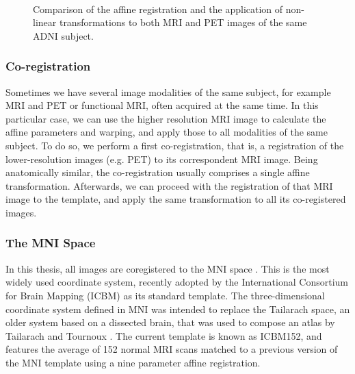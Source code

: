 \begin{figure}[bth]
	\myfloatalign
	 \\
	\caption[Comparison of the affine registration and the application of non-linear transformations to the images]{Comparison of the affine registration and the application of non-linear transformations to both \ac{MRI} and \ac{PET} images of the same \ac{ADNI} subject.}\label{fig:diffeomorphisms}
\end{figure}


\subsubsection{Co-registration}
Sometimes we have several image modalities of the same subject, for example \ac{MRI} and \ac{PET} or functional \ac{MRI}, often acquired at the same time. In this particular case, we can use the higher resolution \ac{MRI} image to calculate the affine parameters and warping, and apply those to all modalities of the same subject. To do so, we perform a first co-registration, that is, a registration of the lower-resolution images (e.g. \ac{PET}) to its correspondent \ac{MRI} image. Being anatomically similar, the co-registration usually comprises a single affine transformation. Afterwards, we can proceed with the registration of that \ac{MRI} image to the template, and apply the same transformation to all its co-registered images. 

\subsubsection{The MNI Space}
In this thesis, all images are coregistered to the \acf{MNI} space \cite{Mazziotta2001}. This is the most widely used coordinate system, recently adopted by the International Consortium for Brain Mapping (ICBM) as its standard template. The three-dimensional coordinate system defined in \ac{MNI} was intended to replace the Tailarach space, an older system based on a dissected brain, that was used to compose an atlas by Tailarach and Tournoux \cite{Talairach1988c}. The current template is known as ICBM152, and features the average of 152 normal \ac{MRI} scans matched to a previous version of the \ac{MNI} template using a nine parameter affine registration. 

